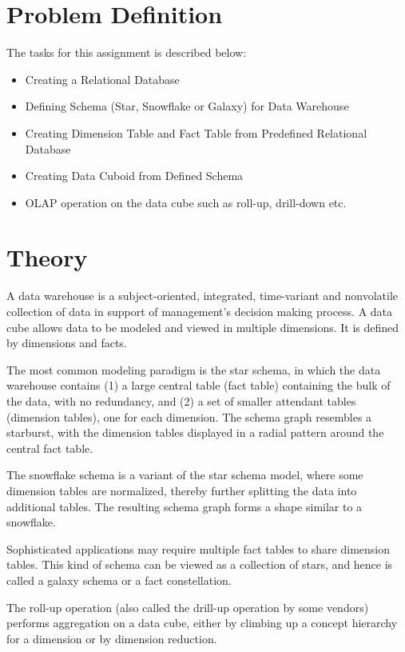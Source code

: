 \documentclass[12pt]{article}
\begin{document}
\maketitle
\thispagestyle{empty}
\clearpage
\newpage

\section{Problem Definition}
The tasks for this assignment is described below:
\begin{itemize}
	\item Creating a Relational Database
	\item Defining Schema (Star, Snowflake or Galaxy) for Data Warehouse
	\item Creating Dimension Table and Fact Table from Predefined Relational Database
	\item Creating Data Cuboid from Defined Schema
	\item OLAP operation on the data cube such as roll-up, drill-down etc.
\end{itemize}

\section{Theory}
A data warehouse is a subject-oriented, integrated, time-variant and nonvolatile collection of data in support of management’s decision making process. A data cube allows data to be modeled and viewed in multiple
dimensions. It is defined by dimensions and facts.

The most common modeling paradigm is the star schema, in which the data warehouse contains (1) a large central table (fact table) containing the bulk of the data, with no redundancy, and (2) a set of smaller attendant tables (dimension tables), one for each dimension. The schema graph resembles a starburst, with the dimension tables displayed in a radial pattern around the central fact table.

The snowflake schema is a variant of the star schema model, where some dimension tables are normalized, thereby further splitting the data into additional tables. The resulting schema graph forms a shape similar to a snowflake.

Sophisticated applications may require multiple fact tables to share dimension tables. This kind of schema can be viewed as a collection of stars, and hence is called a galaxy schema or a fact constellation.

The roll-up operation (also called the drill-up operation by some vendors)
performs aggregation on a data cube, either by climbing up a concept hierarchy for a dimension or by dimension reduction.
\end{document}
